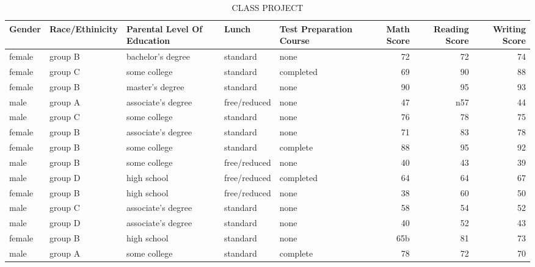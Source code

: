\documentclass{article}
\begin{document}
	
	\begin{table}[h!]
		\caption{CLASS PROJECT}
		\label{tab:table1}
		\begin{tabular}{|l|l|l|l|l|r|r|r|}
			\textbf{Gender} & \textbf{Race/Ethinicity} & \textbf{Parental Level Of Education} & \textbf{Lunch} & \textbf{Test Preparation Course} & \textbf{Math Score} & \textbf{Reading Score} &
			\textbf{Writing Score}\\
			\hline
			female & group B & bachelor's degree & standard & none & 72 & 72 & 74 \\
			female & group C & some college & standard & completed & 69 & 90 & 88\\
			female & group B & master's degree & standard & none & 90 & 95 & 93\\
			male & group A & associate's degree & free/reduced & none & 47 & n57 & 44\\
			male & group C & some college & standard & none & 76 & 78 & 75\\
			female & group B & associate's degree & standard & none & 71 & 83 & 78\\
			female & group B & some college & standard & complete & 88 & 95 & 92\\
			male & group B & some college & free/reduced & none & 40 & 43 & 39\\
			male & group D & high school & free/reduced & completed & 64 & 64 & 67\\
			female & group B & high school & free/reduced & none & 38 & 60 & 50\\
			male & group C & associate's degree & standard & none & 58 & 54 & 52\\
			male & group D & associate's degree & standard & none & 40 & 52 & 43\\
			female & group B & high school & standard & none & 65b & 81 & 73\\
			male & group A& some college & standard & complete & 78 & 72 & 70\\
			
		\end{tabular}
		
	\end{table}
\end{document}
